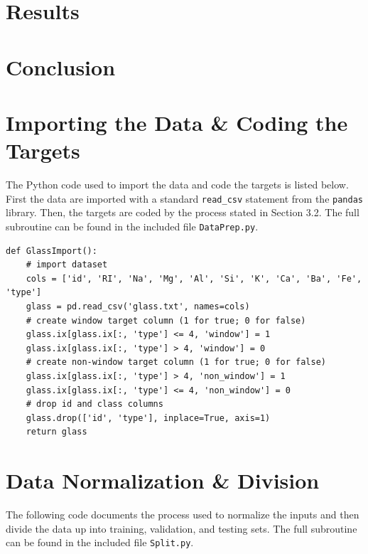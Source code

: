 \documentclass[12pt,halfline,a4paper]{ouparticle}
\begin{document}
\section{Results}
\label{sec6}



\section{Conclusion}
\label{sec7}


\pagebreak

\printbibliography[heading=bibintoc, title={References}]

\pagebreak

\appendix

\section{Importing the Data \& Coding the Targets}

The Python code used to import the data and code the targets is listed below. First the data are imported with a standard \verb|read_csv| statement from the \verb|pandas| library. Then, the targets are coded by the process stated in Section 3.2. The full subroutine can be found in the included file \verb|DataPrep.py|.

\begin{lstlisting}[style = Python]
def GlassImport():
    # import dataset
    cols = ['id', 'RI', 'Na', 'Mg', 'Al', 'Si', 'K', 'Ca', 'Ba', 'Fe', 'type']
    glass = pd.read_csv('glass.txt', names=cols)
    # create window target column (1 for true; 0 for false)
    glass.ix[glass.ix[:, 'type'] <= 4, 'window'] = 1
    glass.ix[glass.ix[:, 'type'] > 4, 'window'] = 0
    # create non-window target column (1 for true; 0 for false)
    glass.ix[glass.ix[:, 'type'] > 4, 'non_window'] = 1
    glass.ix[glass.ix[:, 'type'] <= 4, 'non_window'] = 0
    # drop id and class columns
    glass.drop(['id', 'type'], inplace=True, axis=1)
    return glass
\end{lstlisting} 
\pagebreak

\section{Data Normalization \& Division}
The following code documents the process used to normalize the inputs and then divide the data up into training, validation, and testing sets. The full subroutine can be found in the included file \verb|Split.py|.
\end{document}
